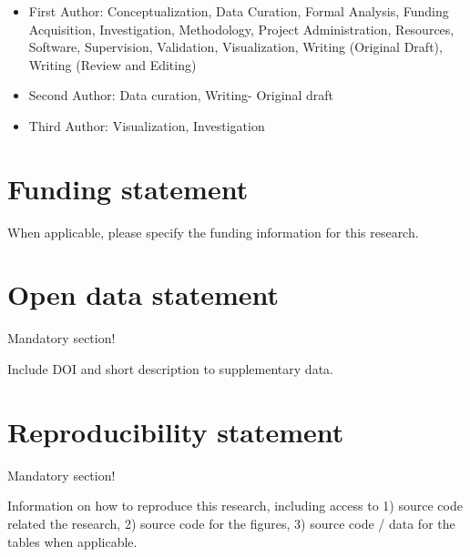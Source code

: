 \documentclass[
  manuscript=article,  %
  layout=preprint,  %
  year=20xx,
  volume=x,
]{extra/joas}
\begin{document}
\begin{itemize}
  \item First Author: Conceptualization, Data Curation, Formal Analysis, Funding Acquisition, Investigation, Methodology, Project Administration, Resources, Software, Supervision, Validation, Visualization, Writing (Original Draft), Writing (Review and Editing)
  \item Second Author: Data curation, Writing- Original draft
  \item Third Author: Visualization, Investigation
\end{itemize}


\section*{Funding statement}
When applicable, please specify the funding information for this research.


\section*{Open data statement}
Mandatory section! 

Include DOI and short description to supplementary data.

\section*{Reproducibility statement}
Mandatory section!

Information on how to reproduce this research, including access to 1) source code related the research, 2) source code for the figures, 3) source code / data for the tables when applicable.



\printbibliography
\end{document}
